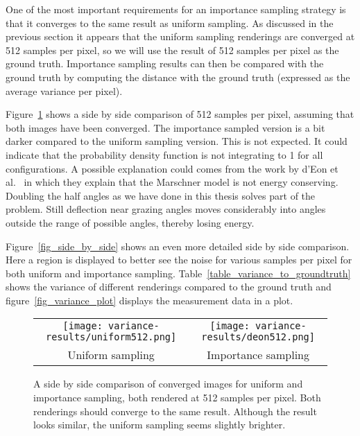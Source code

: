 \documentclass[11pt,a4paper]{report}
\begin{document}
One of the most important requirements for an importance sampling strategy is that it converges to the same result as uniform sampling. As discussed in the previous section it appears that the uniform sampling renderings are converged at 512 samples per pixel, so we will use the result of 512 samples per pixel as the ground truth. Importance sampling results can then be compared with the ground truth by computing the distance with the ground truth (expressed as the average variance per pixel).

Figure~\ref{fig_sidebyside_converged} shows a side by side comparison of 512 samples per pixel, assuming that both images have been converged. The importance sampled version is a bit darker compared to the uniform sampling version. This is not expected. It could indicate that the probability density function is not integrating to 1 for all configurations. A possible explanation could comes from the work by d'Eon et al.~\cite{eon2011} in which they explain that the Marschner model is not energy conserving. Doubling the half angles as we have done in this thesis solves part of the problem. Still deflection near grazing angles moves considerably into angles outside the range of possible angles, thereby losing energy.

Figure~\ref{fig_side_by_side} shows an even more detailed side by side comparison. Here a region is displayed to better see the noise for various samples per pixel for both uniform and importance sampling. Table~\ref{table_variance_to_groundtruth} shows the variance of different renderings compared to the ground truth and figure~\ref{fig_variance_plot} displays the measurement data in a plot.


\begin{figure}
\begin{center}
\begin{tabular}{cc}
\texttt{[image: variance-results/uniform512.png]} & \texttt{[image: variance-results/deon512.png]} \\ 
Uniform sampling & Importance sampling \\
\end{tabular}
\end{center}
\caption{A side by side comparison of converged images for uniform and importance sampling, both rendered at 512 samples per pixel. Both renderings should converge to the same result. Although the result looks similar, the uniform sampling seems slightly brighter.}
\label{fig_sidebyside_converged}
\end{figure}
\end{document}
